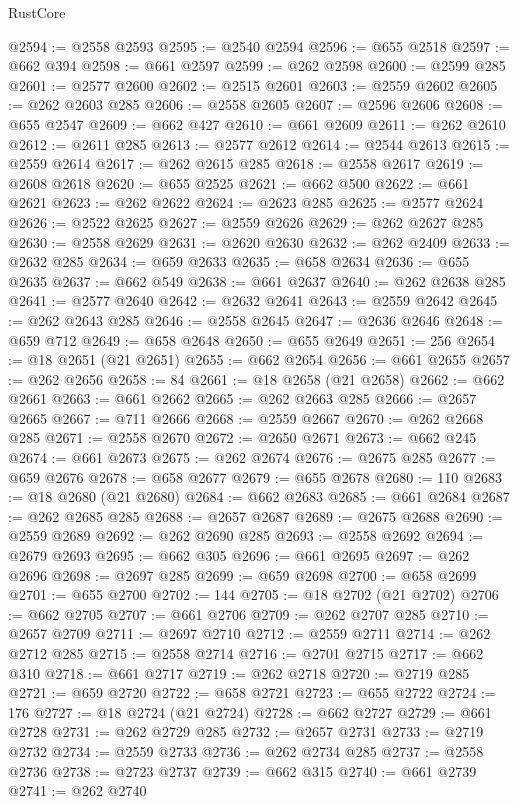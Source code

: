 \begin{lexlean}{RustCore}
\begin{coremodule}
@2594 := @2558 @2593
@2595 := @2540 @2594
@2596 := @655 @2518
@2597 := @662 @394
@2598 := @661 @2597
@2599 := @262 @2598
@2600 := @2599 @285
@2601 := @2577 @2600
@2602 := @2515 @2601
@2603 := @2559 @2602
@2605 := @262 @2603 @285
@2606 := @2558 @2605
@2607 := @2596 @2606
@2608 := @655 @2547
@2609 := @662 @427
@2610 := @661 @2609
@2611 := @262 @2610
@2612 := @2611 @285
@2613 := @2577 @2612
@2614 := @2544 @2613
@2615 := @2559 @2614
@2617 := @262 @2615 @285
@2618 := @2558 @2617
@2619 := @2608 @2618
@2620 := @655 @2525
@2621 := @662 @500
@2622 := @661 @2621
@2623 := @262 @2622
@2624 := @2623 @285
@2625 := @2577 @2624
@2626 := @2522 @2625
@2627 := @2559 @2626
@2629 := @262 @2627 @285
@2630 := @2558 @2629
@2631 := @2620 @2630
@2632 := @262 @2409
@2633 := @2632 @285
@2634 := @659 @2633
@2635 := @658 @2634
@2636 := @655 @2635
@2637 := @662 @549
@2638 := @661 @2637
@2640 := @262 @2638 @285
@2641 := @2577 @2640
@2642 := @2632 @2641
@2643 := @2559 @2642
@2645 := @262 @2643 @285
@2646 := @2558 @2645
@2647 := @2636 @2646
@2648 := @659 @712
@2649 := @658 @2648
@2650 := @655 @2649
@2651 := 256
@2654 := @18 @2651 (@21 @2651)
@2655 := @662 @2654
@2656 := @661 @2655
@2657 := @262 @2656
@2658 := 84
@2661 := @18 @2658 (@21 @2658)
@2662 := @662 @2661
@2663 := @661 @2662
@2665 := @262 @2663 @285
@2666 := @2657 @2665
@2667 := @711 @2666
@2668 := @2559 @2667
@2670 := @262 @2668 @285
@2671 := @2558 @2670
@2672 := @2650 @2671
@2673 := @662 @245
@2674 := @661 @2673
@2675 := @262 @2674
@2676 := @2675 @285
@2677 := @659 @2676
@2678 := @658 @2677
@2679 := @655 @2678
@2680 := 110
@2683 := @18 @2680 (@21 @2680)
@2684 := @662 @2683
@2685 := @661 @2684
@2687 := @262 @2685 @285
@2688 := @2657 @2687
@2689 := @2675 @2688
@2690 := @2559 @2689
@2692 := @262 @2690 @285
@2693 := @2558 @2692
@2694 := @2679 @2693
@2695 := @662 @305
@2696 := @661 @2695
@2697 := @262 @2696
@2698 := @2697 @285
@2699 := @659 @2698
@2700 := @658 @2699
@2701 := @655 @2700
@2702 := 144
@2705 := @18 @2702 (@21 @2702)
@2706 := @662 @2705
@2707 := @661 @2706
@2709 := @262 @2707 @285
@2710 := @2657 @2709
@2711 := @2697 @2710
@2712 := @2559 @2711
@2714 := @262 @2712 @285
@2715 := @2558 @2714
@2716 := @2701 @2715
@2717 := @662 @310
@2718 := @661 @2717
@2719 := @262 @2718
@2720 := @2719 @285
@2721 := @659 @2720
@2722 := @658 @2721
@2723 := @655 @2722
@2724 := 176
@2727 := @18 @2724 (@21 @2724)
@2728 := @662 @2727
@2729 := @661 @2728
@2731 := @262 @2729 @285
@2732 := @2657 @2731
@2733 := @2719 @2732
@2734 := @2559 @2733
@2736 := @262 @2734 @285
@2737 := @2558 @2736
@2738 := @2723 @2737
@2739 := @662 @315
@2740 := @661 @2739
@2741 := @262 @2740

\end{coremodule}
\end{lexlean}
